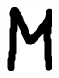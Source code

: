 \documentclass[russian,utf8,emptystyle]{eskdtext}
\begin{document}
\begin{figure}[!htb]
\includegraphics[width=\linewidth]{../data/learn/m/001}
\endminipage\hfill
{}

\end{figure}
\end{document}
